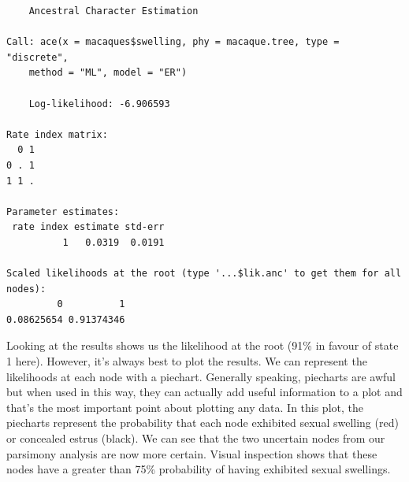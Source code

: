 \documentclass[
]{book}
\newenvironment{Shaded}{\begin{snugshade}}{\end{snugshade}}
\newcommand{\DataTypeTok}[1]{\textcolor[rgb]{0.13,0.29,0.53}{#1}}
\newcommand{\DecValTok}[1]{\textcolor[rgb]{0.00,0.00,0.81}{#1}}
\newcommand{\FloatTok}[1]{\textcolor[rgb]{0.00,0.00,0.81}{#1}}
\newcommand{\KeywordTok}[1]{\textcolor[rgb]{0.13,0.29,0.53}{\textbf{#1}}}
\newcommand{\NormalTok}[1]{#1}
\newcommand{\OperatorTok}[1]{\textcolor[rgb]{0.81,0.36,0.00}{\textbf{#1}}}
\newcommand{\OtherTok}[1]{\textcolor[rgb]{0.56,0.35,0.01}{#1}}
\newcommand{\StringTok}[1]{\textcolor[rgb]{0.31,0.60,0.02}{#1}}
\begin{document}
\begin{verbatim}
    Ancestral Character Estimation

Call: ace(x = macaques$swelling, phy = macaque.tree, type = "discrete", 
    method = "ML", model = "ER")

    Log-likelihood: -6.906593 

Rate index matrix:
  0 1
0 . 1
1 1 .

Parameter estimates:
 rate index estimate std-err
          1   0.0319  0.0191

Scaled likelihoods at the root (type '...$lik.anc' to get them for all nodes):
         0          1 
0.08625654 0.91374346 
\end{verbatim}

Looking at the results shows us the likelihood at the root (91\% in favour of state 1 here). However, it's always best to plot the results. We can represent the likelihoods at each node with a piechart. Generally speaking, piecharts are awful but when used in this way, they can actually add useful information to a plot and that's the most important point about plotting any data. In this plot, the piecharts represent the probability that each node exhibited sexual swelling (red) or concealed estrus (black). We can see that the two uncertain nodes from our parsimony analysis are now more certain. Visual inspection shows that these nodes have a greater than 75\% probability of having exhibited sexual swellings.

\begin{Shaded}
\end{Shaded}
\end{document}
